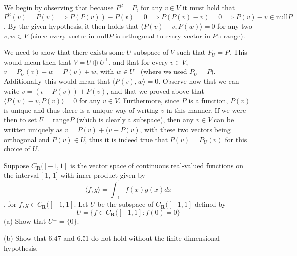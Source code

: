 \begin{solution}

    We begin by observing that because $P^2 = P$, for any $v \in V$ it must hold that $P^2(v) = P(v) \implies P(P(v)) - P(v) = 0 \implies P(P(v) - v) = 0 \implies P(v) - v \in \text{null} P$. By the given hypothesis, it then holds that $\langle P(v) - v, P(w) \rangle = 0$ for any two $v, w \in V$ (since every vector in $\text{null} P$ is orthogonal to every vector in $P$'s range). 

    We need to show that there exists some $U$ subspace of $V$ such that $P_U = P$. This would mean then that $V = U \oplus U^\bot$, and that for every $v \in V$, $v = P_U(v) + w = P(v) + w$, with $w \in U^\bot$ (where we used $P_U = P$). Additionally, this would mean that $\langle P(v), w \rangle = 0$. Observe now that we can write $v = (v - P(v)) + P(v)$, and that we proved above that $\langle P(v) - v, P(v) \rangle = 0$ for any $v \in V$. Furthermore, since $P$ is a function, $P(v)$ is unique and thus there is a unique way of writing $v$ in this manner.  If we were then to set $U = \text{range} P$ (which is clearly a subspace), then any $v \in V$ can be written uniquely as $v = P(v) + (v - P(v)$, with these two vectors being orthogonal and $P(v) \in U$, thus it is indeed true that $P(v) = P_U(v)$ for this choice of $U$.
\end{solution}

\begin{exercise}{14}
    Suppose $C_\textbf{R}([-1, 1]$ is the vector space of continuous real-valued functions on the interval [-1, 1] with inner product given by 
    $$\langle f, g \rangle = \int_{-1}^{1} f(x)g(x) dx$$
    , for $f, g \in C_\textbf{R}([-1, 1]$. Let $U$ be the subspace of $C_\textbf{R}([-1, 1]$ defined by
    $$U = \{f \in C_\textbf{R}([-1, 1]: f(0) = 0\}$$
    (a) Show that $U^\bot = \{0\}$.

    (b) Show that 6.47 and 6.51 do not hold without the finite-dimensional hypothesis.
\end{exercise}

